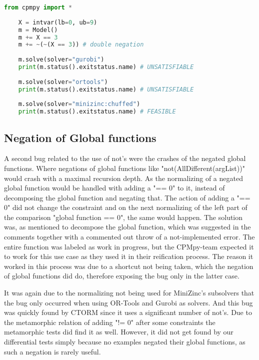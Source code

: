 \label{lst:Bug:DoubleNot}
\begin{lstlisting}[language=python, caption={The "double not"-bug.}]
	from cpmpy import *
	
	X = intvar(lb=0, ub=9)
	m = Model()
	m += X == 3
	m += ~(~(X == 3)) # double negation 
	
	m.solve(solver="gurobi")
	print(m.status().exitstatus.name) # UNSATISFIABLE
	
	m.solve(solver="ortools")
	print(m.status().exitstatus.name) # UNSATISFIABLE
	
	m.solve(solver="minizinc:chuffed")
	print(m.status().exitstatus.name) # FEASIBLE	
\end{lstlisting}

\subsection{Negation of Global functions}
\label{res:bug:NegatedGlobal}
A second bug related to the use of not's were the crashes of the negated global functions. Where negations of global functions like "not(AllDifferent(argList))" would crash with a maximal recursion depth. As the normalizing of a negated global function would be handled with adding a "== 0" to it, instead of decomposing the global function and negating that. The action of adding a "== 0" did not change the constraint and on the next normalizing of the left part of the comparison "global function == 0", the same would happen. The solution was, as mentioned to decompose the global function, which was suggested in the comments together with a commented out throw of a not-implemented error. The entire function was labeled as work in progress, but the CPMpy-team expected it to work for this use case as they used it in their reification process. The reason it worked in this process was due to a shortcut not being taken, which the negation of global functions did do, therefore exposing the bug only in the latter case.

It was again due to the normalizing not being used for MiniZinc's subsolvers that the bug only occurred when using OR-Tools and Gurobi as solvers. And this bug was quickly found by CTORM since it uses a significant number of not's. Due to the metamorphic relation of adding "!= 0" after some constraints the metamorphic tests did find it as well. However, it did not get found by our differential tests simply because no examples negated their global functions, as such a negation is rarely useful. 


